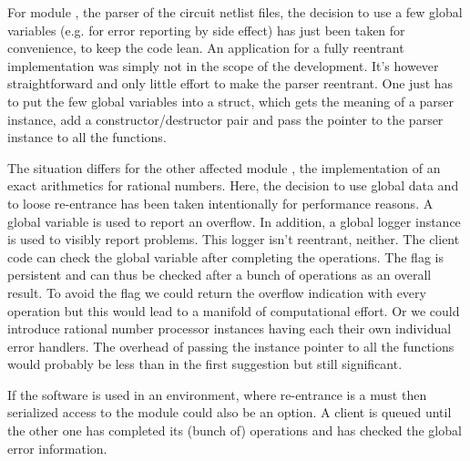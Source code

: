 For module , the parser of the circuit netlist
files, the decision to use a few global variables (e.g. for error
reporting by side effect) has just been taken for convenience, to keep the
code lean. An application for a fully reentrant implementation was simply
not in the scope of the development. It's however straightforward and only
little effort to make the parser reentrant. One just has to put the few
global variables into a struct, which gets the meaning of a parser
instance, add a constructor/destructor pair and pass the pointer to the
parser instance to all the functions.

The situation differs for the other affected module
, the implementation of an exact arithmetics
for rational numbers. Here, the decision to use global data and to loose
re-entrance has been taken intentionally for performance reasons. A global
variable is used to report an overflow. In addition, a global logger
instance is used to visibly report problems. This logger isn't reentrant,
neither. The client code can check the global variable after completing
the operations. The flag is persistent and can thus be checked after a
bunch of operations as an overall result. To avoid the flag we could
return the overflow indication with every operation but this would lead to
a manifold of computational effort. Or we could introduce rational number
processor instances having each their own individual error handlers. The
overhead of passing the instance pointer to all the functions would
probably be less than in the first suggestion but still significant.

If the software is used in an environment, where re-entrance is a must then
serialized access to the module could also be an option. A client is
queued until the other one has completed its (bunch of) operations and has
checked the global error information.